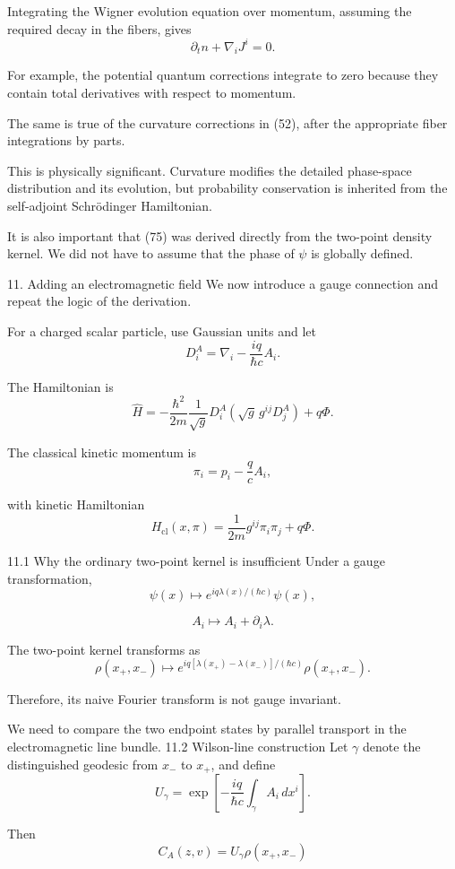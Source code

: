 Integrating the Wigner evolution equation over momentum, assuming the required decay in the fibers, gives
\[
\boxed{
\partial_tn+\nabla_iJ^i=0.
}
\tag{76}
\]

For example, the potential quantum corrections integrate to zero because they contain total derivatives with respect to momentum.

The same is true of the curvature corrections in (52), after the appropriate fiber integrations by parts.

This is physically significant. Curvature modifies the detailed phase-space distribution and its evolution, but probability conservation is inherited from the self-adjoint Schrödinger Hamiltonian.

It is also important that (75) was derived directly from the two-point density kernel. We did not have to assume that the phase of \(\psi\) is globally defined.

11. Adding an electromagnetic field
We now introduce a gauge connection and repeat the logic of the derivation.

For a charged scalar particle, use Gaussian units and let
\[
D_i^A=\nabla_i-\frac{iq}{\hbar c}A_i.
\tag{77}
\]

The Hamiltonian is
\[
\boxed{
\widehat H=
-\frac{\hbar^2}{2m}
\frac1{\sqrt g}D_i^A
\left(\sqrt g\,g^{ij}D_j^A\right)
+q\Phi.
}
\tag{78}
\]

The classical kinetic momentum is
\[
\pi_i=p_i-\frac qcA_i,
\]

with kinetic Hamiltonian
\[
H_{\mathrm{cl}}(x,\pi)
=
\frac1{2m}g^{ij}\pi_i\pi_j+q\Phi.
\tag{79}
\]

11.1 Why the ordinary two-point kernel is insufficient
Under a gauge transformation,
\[
\psi(x)\mapsto
e^{iq\lambda(x)/(\hbar c)}\psi(x),
\]

\[
A_i\mapsto A_i+\partial_i\lambda.
\]

The two-point kernel transforms as
\[
\rho(x_+,x_-)
\mapsto
e^{iq[\lambda(x_+)-\lambda(x_-)]/(\hbar c)}
\rho(x_+,x_-).
\tag{80}
\]

Therefore, its naive Fourier transform is not gauge invariant.

We need to compare the two endpoint states by parallel transport in the electromagnetic line bundle.
11.2 Wilson-line construction
Let \(\gamma\) denote the distinguished geodesic from \(x_-\) to \(x_+\), and define
\[
U_\gamma=
\exp\left[
-\frac{iq}{\hbar c}
\int_\gamma A_i\,dx^i
\right].
\tag{81}
\]

Then
\[
C_A(z,v)=
U_\gamma\rho(x_+,x_-)
\tag{82}
\]

